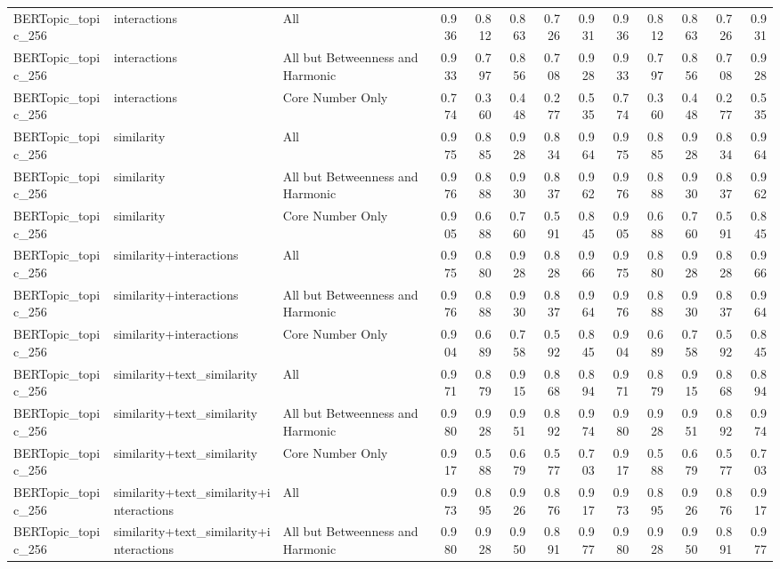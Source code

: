 \begin{tabular}{lllrrrrrrrrrr}
BERTopic_topic_256 & interactions & All & 0.936 & 0.812 & 0.863 & 0.726 & 0.931 & 0.936 & 0.812 & 0.863 & 0.726 & 0.931 \\
BERTopic_topic_256 & interactions & All but Betweenness and Harmonic & 0.933 & 0.797 & 0.856 & 0.708 & 0.928 & 0.933 & 0.797 & 0.856 & 0.708 & 0.928 \\
BERTopic_topic_256 & interactions & Core Number Only & 0.774 & 0.360 & 0.448 & 0.277 & 0.535 & 0.774 & 0.360 & 0.448 & 0.277 & 0.535 \\
BERTopic_topic_256 & similarity & All & 0.975 & 0.885 & 0.928 & 0.834 & 0.964 & 0.975 & 0.885 & 0.928 & 0.834 & 0.964 \\
BERTopic_topic_256 & similarity & All but Betweenness and Harmonic & 0.976 & 0.888 & 0.930 & 0.837 & 0.962 & 0.976 & 0.888 & 0.930 & 0.837 & 0.962 \\
BERTopic_topic_256 & similarity & Core Number Only & 0.905 & 0.688 & 0.760 & 0.591 & 0.845 & 0.905 & 0.688 & 0.760 & 0.591 & 0.845 \\
BERTopic_topic_256 & similarity+interactions & All & 0.975 & 0.880 & 0.928 & 0.828 & 0.966 & 0.975 & 0.880 & 0.928 & 0.828 & 0.966 \\
BERTopic_topic_256 & similarity+interactions & All but Betweenness and Harmonic & 0.976 & 0.888 & 0.930 & 0.837 & 0.964 & 0.976 & 0.888 & 0.930 & 0.837 & 0.964 \\
BERTopic_topic_256 & similarity+interactions & Core Number Only & 0.904 & 0.689 & 0.758 & 0.592 & 0.845 & 0.904 & 0.689 & 0.758 & 0.592 & 0.845 \\
BERTopic_topic_256 & similarity+text_similarity & All & 0.971 & 0.879 & 0.915 & 0.868 & 0.894 & 0.971 & 0.879 & 0.915 & 0.868 & 0.894 \\
BERTopic_topic_256 & similarity+text_similarity & All but Betweenness and Harmonic & 0.980 & 0.928 & 0.951 & 0.892 & 0.974 & 0.980 & 0.928 & 0.951 & 0.892 & 0.974 \\
BERTopic_topic_256 & similarity+text_similarity & Core Number Only & 0.917 & 0.588 & 0.679 & 0.577 & 0.703 & 0.917 & 0.588 & 0.679 & 0.577 & 0.703 \\
BERTopic_topic_256 & similarity+text_similarity+interactions & All & 0.973 & 0.895 & 0.926 & 0.876 & 0.917 & 0.973 & 0.895 & 0.926 & 0.876 & 0.917 \\
BERTopic_topic_256 & similarity+text_similarity+interactions & All but Betweenness and Harmonic & 0.980 & 0.928 & 0.950 & 0.891 & 0.977 & 0.980 & 0.928 & 0.950 & 0.891 & 0.977 \\

\end{tabular}
